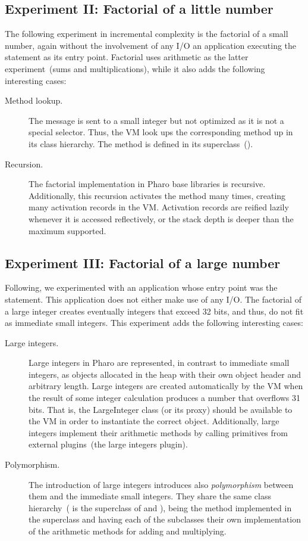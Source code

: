 \subsection*{Experiment II: Factorial of a little number}

The following experiment in incremental complexity is the factorial of a small number, again without the involvement of any I/O \ie an application executing the  statement as its entry point. Factorial uses arithmetic as the latter experiment~(sums and multiplications), while it also adds the following interesting cases:

\begin{description}
\item[Method lookup.] The  message is sent to a small integer but not optimized as it is not a special selector. Thus, the VM look ups the corresponding method up in its class hierarchy. The method  is defined in its superclass~().
\item[Recursion.] The factorial implementation in Pharo base libraries is recursive. Additionally, this recursion activates the  method many times, creating many activation records in the VM. Activation records are reified lazily whenever it is accessed reflectively, or the stack depth is deeper than the maximum supported.
\end{description}

\subsection*{Experiment III: Factorial of a large number}

Following, we experimented with an application whose entry point was the  statement. This application does not either make use of any I/O. The factorial of a large integer creates eventually integers that exceed 32 bits, and thus, do not fit as immediate small integers. This experiment adds the following interesting cases:
\begin{description}
\item[Large integers.] Large integers in Pharo are represented, in contrast to immediate small integers, as objects allocated in the heap with their own object header and arbitrary length. Large integers are created automatically by the VM when the result of some integer calculation produces a number that overflows 31 bits. That is, the LargeInteger class (or its proxy) should be available to the VM in order to instantiate the correct object.  Additionally, large integers implement their arithmetic methods by calling primitives from external plugins~(the large integers plugin).
\item[Polymorphism.] The introduction of large integers introduces also \emph{polymorphism} between them and the immediate small integers. They share the same class hierarchy~( is the superclass of  and ), being the method  implemented in the superclass and having each of the subclasses their own implementation of the arithmetic methods for adding and multiplying.
\end{description}

